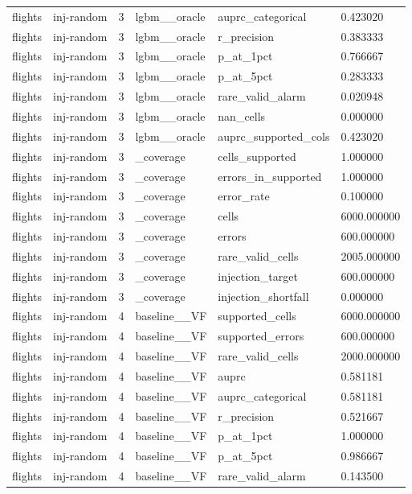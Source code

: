 \begin{tabular}{llllll}
flights & inj-random & 3 & lgbm\_\_oracle & auprc\_categorical & 0.423020 \\
flights & inj-random & 3 & lgbm\_\_oracle & r\_precision & 0.383333 \\
flights & inj-random & 3 & lgbm\_\_oracle & p\_at\_1pct & 0.766667 \\
flights & inj-random & 3 & lgbm\_\_oracle & p\_at\_5pct & 0.283333 \\
flights & inj-random & 3 & lgbm\_\_oracle & rare\_valid\_alarm & 0.020948 \\
flights & inj-random & 3 & lgbm\_\_oracle & nan\_cells & 0.000000 \\
flights & inj-random & 3 & lgbm\_\_oracle & auprc\_supported\_cols & 0.423020 \\
flights & inj-random & 3 & \_coverage & cells\_supported & 1.000000 \\
flights & inj-random & 3 & \_coverage & errors\_in\_supported & 1.000000 \\
flights & inj-random & 3 & \_coverage & error\_rate & 0.100000 \\
flights & inj-random & 3 & \_coverage & cells & 6000.000000 \\
flights & inj-random & 3 & \_coverage & errors & 600.000000 \\
flights & inj-random & 3 & \_coverage & rare\_valid\_cells & 2005.000000 \\
flights & inj-random & 3 & \_coverage & injection\_target & 600.000000 \\
flights & inj-random & 3 & \_coverage & injection\_shortfall & 0.000000 \\
flights & inj-random & 4 & baseline\_\_VF & supported\_cells & 6000.000000 \\
flights & inj-random & 4 & baseline\_\_VF & supported\_errors & 600.000000 \\
flights & inj-random & 4 & baseline\_\_VF & rare\_valid\_cells & 2000.000000 \\
flights & inj-random & 4 & baseline\_\_VF & auprc & 0.581181 \\
flights & inj-random & 4 & baseline\_\_VF & auprc\_categorical & 0.581181 \\
flights & inj-random & 4 & baseline\_\_VF & r\_precision & 0.521667 \\
flights & inj-random & 4 & baseline\_\_VF & p\_at\_1pct & 1.000000 \\
flights & inj-random & 4 & baseline\_\_VF & p\_at\_5pct & 0.986667 \\
flights & inj-random & 4 & baseline\_\_VF & rare\_valid\_alarm & 0.143500 \\

\end{tabular}
